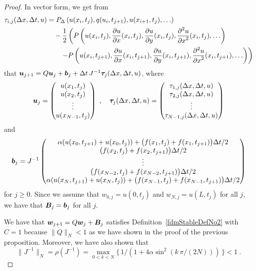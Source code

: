 \begin{proof}
In vector form, we get from
\begin{align*}
\tau_{i,j}(\Delta{x},\Delta{t},u)
&=  P_\Delta\left(u(x_i,t_j), q(u_i,t_{j+1}),
u(x_{i+1},t_j), \ldots\right) \\ 
&\quad - \frac{1}{2} \left(
P\left(u(x_i,t_j), \frac{\partial{u}}{\partial{x}}(x_i,t_j), \frac{\partial{u}}{\partial{y}}(x_i,t_j),
\frac{\displaystyle \partial^{2}{u}} {\displaystyle \partial{x}^{2}}(x_i,t_j), \ldots \right) \right. \\
&\qquad \left. - P\left(u(x_i,t_{j+1}), \frac{\partial{u}}{\partial{x}}(x_i,t_{j+1}),
\frac{\partial{u}}{\partial{y}}(x_i,t_{j+1}), \frac{\displaystyle \partial^{2}{u}} {\displaystyle \partial{x}^{2}}(x_i,t_{j+1}), \ldots \right)
\right)
\end{align*}
that
$\bm{u}_{j+1} = Q \bm{u}_j + \bm{b}_j
+ \Delta{t}\, J^{-1} \bm{\tau}_j(\Delta{x},\Delta{t},u)$, where
\[
\bm{u}_j = \begin{pmatrix}
u(x_1,t_j) \\ u(x_2,t_j) \\ \vdots \\ u(x_{N-1},t_j)
\end{pmatrix}
\ , \quad 
\bm{\tau}_j(\Delta{x},\Delta{t},u)
= \begin{pmatrix}
\tau_{1,j}(\Delta{x},\Delta{t},u) \\ \tau_{2,j}(\Delta{x},\Delta{t},u) \\
\vdots \\ \tau_{N-1,j}(\Delta{x},\Delta{t},u) 
\end{pmatrix}
\]
and
\[
\bm{b}_j = J^{-1} \begin{pmatrix}
\alpha (u(x_0,t_{j+1}) + u(x_0,t_j))
+ \big( f(x_1,t_j) + f(x_1,t_{j+1})\big)\Delta{t}/2 \\
\big( f(x_2,t_j)  + f(x_2,t_{j+1})\big)\Delta{t}/2 \\
\vdots \\
\big( f(x_{N-2},t_j) + f(x_{N-2},t_{j+1})\big)\Delta{t}/2 \\
\alpha ( u(x_N,t_{j+1}) + u(x_N,t_j))
+ \big( f(x_{N-1},t_j) + f(x_{N-1},t_{j+1})\big)\Delta{t}/2
\end{pmatrix}
\]
for $j\geq 0$.  Since we assume that $w_{0,j} = u(0,t_j)$ and
$w_{N,j} = u(L,t_j)$ for all $j$, we have that $\bm{B}_j = \bm{b}_j$
for all $j$.

We have that $\bm{w}_{j+1} = Q\bm{w}_j + \bm{B}_j$ satisfies
Definition~\ref{fdmStableDefNo2} with $C=1$ because $\|Q\|_N < 1$ as
we have shown in the proof of the previous proposition.  Moreover, we
have also shown that
\[
\|J^{-1}\|_N = \rho(J^{-1}) = \max_{0<k<N}
\{\, 1/(1 + 4 \alpha \sin^2\left(k\,\pi/(2N)\right)) \, \} < 1 \ .
\]


\end{proof}
